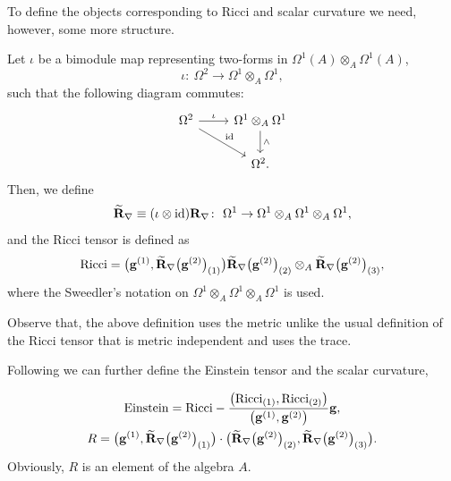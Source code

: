 \documentclass[10pt,a4paper]{amsart}
\numberwithin{equation}{section}
\begin{document}
To define the objects corresponding to Ricci and scalar curvature we need, however, some more structure.
\begin{Definition}
Let $\iota$ be a bimodule map representing two-forms in $\Omega^1(A) \otimes_A \Omega^1(A)$,
\begin{equation*}
\iota\colon \ \Omega^2\rightarrow \Omega^1\otimes_A\Omega^1,
\end{equation*}
such that the following diagram commutes:
\[
\begin{tikzcd}\Omega^2\arrow[dr,"\mathrm{id}"]\arrow[r,"\iota"]& \Omega^1\otimes_A\Omega^1\arrow[d,"\wedge"] \\ &\Omega^2.
\end{tikzcd}
\]
Then, we define
\begin{equation*}
\widetilde{{\bf R}}_\nabla\equiv(\iota\otimes \mathrm{id}){\bf R}_\nabla \colon \ \Omega^1\rightarrow\Omega^1\otimes_A\Omega^1\otimes_A\Omega^1,
\end{equation*}
and the Ricci tensor is defined as
\begin{equation*}
{\rm Ricci}=\big({\bf g}^{(1)},\widetilde{{\bf R}}_\nabla\big({\bf g}^{(2)}\big)_{(1)}\big)\widetilde{{\bf R}}_\nabla\big({\bf g}^{(2)}\big)_{(2)}\otimes_A \widetilde{{\bf R}}_\nabla\big({\bf g}^{(2)}\big)_{(3)},
\end{equation*}
where the Sweedler's notation on $\Omega^1\otimes_A\Omega^1\otimes_A\Omega^1$ is used.
\end{Definition}

Observe that, the above definition uses the metric unlike the usual definition of the Ricci tensor
that is metric independent and uses the trace.

Following \cite{BM14} we can further define the Einstein tensor and the scalar curvature,
\begin{Definition}
\begin{gather*}
{\rm Einstein}={\rm Ricci}-\frac{\big(\mathrm{Ricci}_{(1)},\mathrm{Ricci}_{(2)}\big)}{\big({\bf g}^{(1)},{\bf g}^{(2)}\big)}{\bf g},\\
R=\big({\bf g}^{(1)},\widetilde{{\bf R}}_\nabla\big({\bf g}^{(2)}\big)_{(1)}\big)
\cdot\big(\widetilde{{\bf R}}_\nabla\big({\bf g}^{(2)}\big)_{(2)}, \widetilde{{\bf R}}_\nabla\big({\bf g}^{(2)}\big)_{(3)}\big).
\end{gather*}
Obviously, $R$ is an element of the algebra $A$.
\end{Definition}
\end{document}
